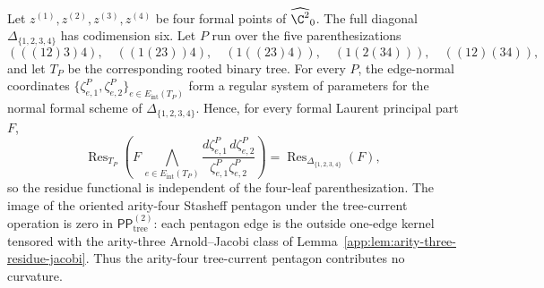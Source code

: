 \begin{lem}
\label{app:lem:arity-four-residue-pentagon}
  Let \(z^{(1)},z^{(2)},z^{(3)},z^{(4)}\) be four formal points of
  \(\widehat{\C^2}_0\).  The full diagonal
  \(\Delta_{\{1,2,3,4\}}\) has codimension six.  Let \(P\) run over
  the five parenthesizations
  \[
    (((12)3)4),\quad ((1(23))4),\quad
    (1((23)4)),\quad (1(2(34))),\quad ((12)(34)),
  \]
  and let \(T_P\) be the corresponding rooted binary tree.  For every
  \(P\), the edge-normal coordinates
  \(\{\zeta^P_{e,1},\zeta^P_{e,2}\}_{e\in E_{\mathrm{int}}(T_P)}\)
  form a regular system of parameters for the normal formal scheme of
  \(\Delta_{\{1,2,3,4\}}\).  Hence, for every formal Laurent principal
  part \(F\),
  \[
    \operatorname{Res}_{T_P}
    \left(
      F\,
      \bigwedge_{e\in E_{\mathrm{int}}(T_P)}
      \frac{d\zeta^P_{e,1}\,d\zeta^P_{e,2}}
           {\zeta^P_{e,1}\zeta^P_{e,2}}
    \right)
    =
    \operatorname{Res}_{\Delta_{\{1,2,3,4\}}}(F),
  \]
  so the residue functional is independent of the four-leaf
  parenthesization.  The image of the oriented arity-four Stasheff
  pentagon under the tree-current operation is zero in
  \(\mathsf{PP}^{(2)}_{\mathrm{tree}}\): each pentagon edge is the
  outside one-edge kernel tensored with the arity-three
  Arnold--Jacobi class of
  Lemma~\ref{app:lem:arity-three-residue-jacobi}.  Thus the
  arity-four tree-current pentagon contributes no curvature.
\end{lem}

